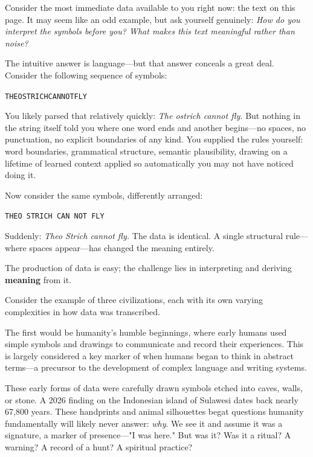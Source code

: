Consider the most immediate data available to you right now: the text 
on this page. It may seem like an odd example, but ask yourself genuinely: 
\textit{How do you interpret the symbols before you? What makes this text 
meaningful rather than noise?}

The intuitive answer is language---but that answer conceals a great deal. 
Consider the following sequence of symbols:

\begin{center}
\texttt{THEOSTRICHCANNOTFLY}
\end{center}

You likely parsed that relatively quickly: \textit{The ostrich cannot fly.} 
But nothing in the string itself told you where one word ends and another 
begins---no spaces, no punctuation, no explicit boundaries of any kind. 
You supplied the rules yourself: word boundaries, grammatical structure, 
semantic plausibility, drawing on a lifetime of learned context applied so 
automatically you may not have noticed doing it.

Now consider the same symbols, differently arranged:

\begin{center}
\texttt{THEO\ STRICH\ CAN\ NOT\ FLY}
\end{center}

Suddenly: \textit{Theo Strich cannot fly.} The data is identical. 
A single structural rule---where spaces appear---has changed the meaning 
entirely.

The production of data is easy; the challenge lies in 
interpreting and deriving \textbf{meaning} from it.

Consider the example of three civilizations, each with its own varying complexities in how data was transcribed. 

The first would be humanity's humble beginnings, where early humans used simple symbols and drawings to communicate and record their experiences. 
This is largely considered a key marker of when humans began to think in abstract terms---a precursor to the development of complex language and writing systems.

These early forms of data were carefully drawn symbols etched into caves, walls, or stone. A 2026 finding on the Indonesian island of Sulawesi dates back nearly 67,800 years. 
These handprints and animal silhouettes begat questions humanity fundamentally will likely never answer: \textit{why}.
We see it and assume it was a signature, a marker of presence—"I was here." But was it? Was it a ritual? A warning? A record of a hunt? A spiritual practice? 

